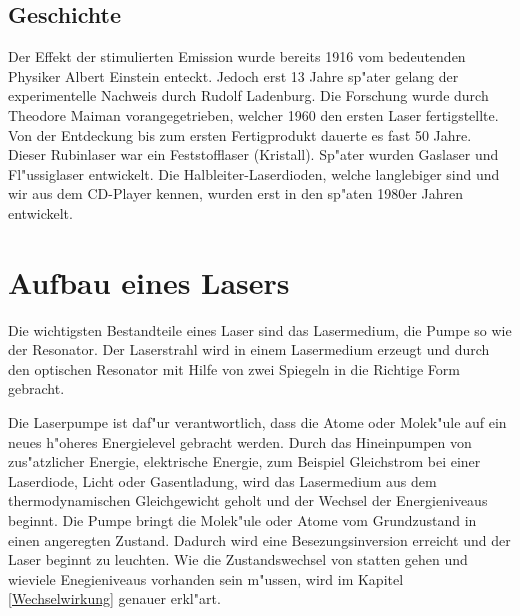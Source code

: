 \begin{refsection}

\subsection{Geschichte}

Der Effekt der stimulierten Emission wurde bereits 1916 vom bedeutenden 
Physiker Albert Einstein enteckt. Jedoch erst 13 Jahre sp"ater gelang der 
experimentelle Nachweis durch Rudolf Ladenburg. Die Forschung wurde durch 
Theodore Maiman vorangegetrieben, welcher 1960 den ersten Laser 
fertigstellte. Von der Entdeckung bis zum ersten Fertigprodukt dauerte es 
fast 50 Jahre. Dieser Rubinlaser war ein Feststofflaser (Kristall). Sp"ater 
wurden Gaslaser und Fl"ussiglaser entwickelt. Die Halbleiter-Laserdioden, 
welche langlebiger sind und wir aus dem CD-Player kennen, wurden erst in den 
sp"aten 1980er Jahren entwickelt.


\section{Aufbau eines Lasers}

Die wichtigsten Bestandteile eines Laser sind das Lasermedium, die Pumpe so 
wie der Resonator. Der Laserstrahl wird in einem Lasermedium erzeugt und 
durch den optischen Resonator mit Hilfe von zwei Spiegeln in die Richtige 
Form gebracht. 

Die Laserpumpe ist daf"ur verantwortlich, dass die Atome oder Molek"ule auf 
ein neues h"oheres Energielevel gebracht werden. Durch das Hineinpumpen von 
zus"atzlicher Energie, elektrische Energie, 
zum Beispiel Gleichstrom bei einer Laserdiode, Licht oder 
Gasentladung, wird das Lasermedium aus dem thermodynamischen Gleichgewicht 
geholt und der Wechsel der Energieniveaus beginnt. Die Pumpe bringt die 
Molek"ule oder Atome vom Grundzustand in einen angeregten Zustand. Dadurch 
wird eine Besezungsinversion erreicht und der Laser beginnt zu leuchten. Wie 
die Zustandswechsel von statten gehen und wieviele Enegieniveaus vorhanden 
sein m"ussen, wird im Kapitel \ref{Wechselwirkung} genauer erkl"art.


\end{refsection}
